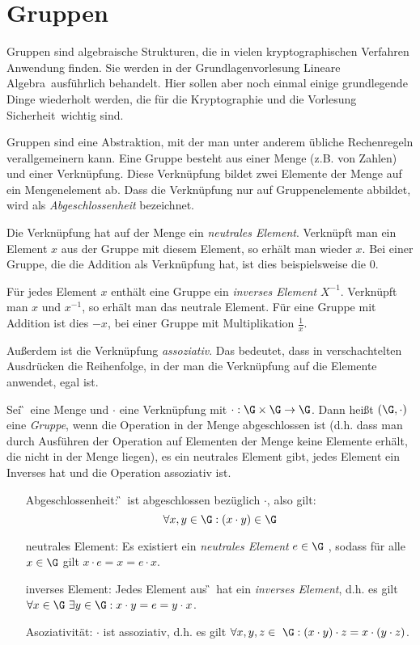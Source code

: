 
\chapter{Gruppen}
Gruppen sind algebraische Strukturen, die in vielen kryptographischen
Verfahren Anwendung finden. Sie werden in der Grundlagenvorlesung
\glqq Lineare Algebra\grqq~ausführlich behandelt. Hier sollen aber noch einmal
einige grundlegende Dinge wiederholt werden, die für die Kryptographie
und die Vorlesung \glqq Sicherheit\grqq~wichtig sind. 

Gruppen sind eine Abstraktion, mit der man unter anderem übliche
Rechenregeln verallgemeinern kann. Eine Gruppe besteht aus einer Menge
(z.B. von Zahlen) und einer Verknüpfung. Diese Verknüpfung bildet zwei
Elemente der Menge auf ein Mengenelement ab. Dass die Verknüpfung nur
auf Gruppenelemente abbildet, wird als \emph{Abgeschlossenheit}
bezeichnet.

Die Verknüpfung hat auf der Menge ein \emph{neutrales
  Element}. Verknüpft man ein Element $x$ aus der Gruppe mit diesem
Element, so erhält man wieder $x$. Bei einer Gruppe, die die Addition
als Verknüpfung hat, ist dies beispielsweise die $0$.

Für jedes Element $x$ enthält eine Gruppe ein \emph{inverses Element}
$X^{-1}$. Verknüpft man $x$ und $x^{-1}$, so erhält man das neutrale
Element. Für eine Gruppe mit Addition ist dies $-x$, bei einer Gruppe
mit Multiplikation $\frac{1}{x}$.

Außerdem ist die Verknüpfung \emph{assoziativ}. Das bedeutet, dass in
verschachtelten Ausdrücken die Reihenfolge, in der man die Verknüpfung
auf die Elemente anwendet, egal ist.

\begin{definition}[Gruppe]
Sei \G~eine Menge und $\cdot$ eine Verknüpfung mit $\cdot: \G\times \G \to
\G$. Dann heißt $(\G, \cdot)$ eine \textit{Gruppe}, wenn die Operation
in der Menge abgeschlossen ist (d.h. dass man durch Ausführen der
Operation auf Elementen der Menge keine Elemente erhält, die nicht in der
Menge liegen), es ein neutrales Element gibt, jedes 
Element ein Inverses hat und die Operation assoziativ ist.
\begin{itemize}
\item[Abgeschlossenheit:] \G~ist abgeschlossen bezüglich $\cdot$, also gilt:
  \[\forall x, y \in \G: (x\cdot y)\in \G\]
\item[neutrales Element:] Es existiert ein \textit{neutrales Element}  $e \in \G$ , sodass für
  alle $x \in \G$ gilt $x\cdot e=x=e\cdot x$.
\item[inverses Element:] Jedes Element aus \G~hat ein \textit{inverses Element}, d.h. es gilt $\forall x \in
  \G~ \exists y \in \G: x\cdot y=e=y\cdot x$.

\item[Asoziativität:] $\cdot$ ist assoziativ, d.h. es gilt $\forall x, y, z  \in ~\G:
  (x\cdot y)\cdot z = x\cdot(y \cdot z)$.
\end{itemize}
\end{definition}

